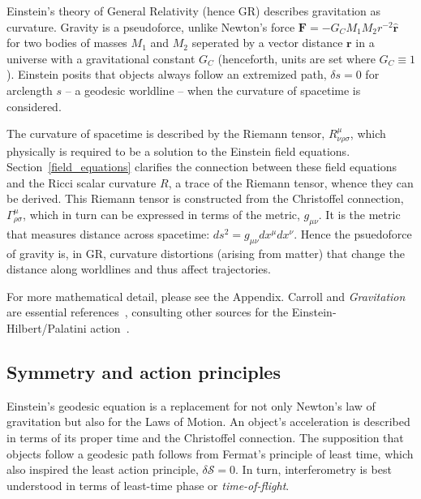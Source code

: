         Einstein's theory of General Relativity (hence GR) describes gravitation as curvature. 
Gravity is a pseudoforce, unlike Newton's force $\textbf{F} = -G_C M_1 M_2 r^{-2} \hat{\textbf{r}}$ for two bodies of masses $M_1$ and $M_2$ seperated by a vector distance $\textbf{r}$ in a universe with a gravitational constant $G_C$ (henceforth, units are set where $G_C \equiv 1$).
 Einstein posits that objects always follow an extremized path, $\delta s = 0$ for arclength $s$  -- a geodesic worldline -- when the curvature of spacetime is considered. 

The curvature of spacetime is described by the Riemann tensor, $R^\mu_{\nu\rho\sigma}$, which physically is required to be a solution to the Einstein field equations. 
Section~\ref{field_equations} clarifies the connection between these field equations and the Ricci scalar curvature $R$, a trace of the Riemann tensor, whence they can be derived. 
This Riemann tensor is constructed from the Christoffel connection, $\Gamma^\mu_{\rho\sigma}$, which in turn can be expressed in terms of the metric, $g_{\mu \nu}$.
It is the metric that measures distance across spacetime: $ds^2 = g_{\mu\nu} dx^\mu dx^\nu$.
Hence the psuedoforce of gravity is, in GR, curvature distortions (arising from matter) that change the distance along worldlines and thus affect trajectories.

For more mathematical detail, please see the Appendix.
 Carroll and \textit{Gravitation} are essential references~\cite{Carroll1997,MisnerThorneWheeler}, consulting other sources for the Einstein-Hilbert/Palatini action~\cite{FarrThesis}.


        \subsection{Symmetry and action principles}
        \label{principles}

Einstein's geodesic equation is a replacement for not only Newton's law of gravitation but also for the Laws of Motion.
An object's acceleration is described in terms of its proper time and the Christoffel connection.
The supposition that objects follow a geodesic path follows from Fermat's principle of least time, which also inspired the least action principle, $\delta \mathcal{S} = 0$.
In turn, interferometry is best understood in terms of least-time phase or \textit{time-of-flight}.

